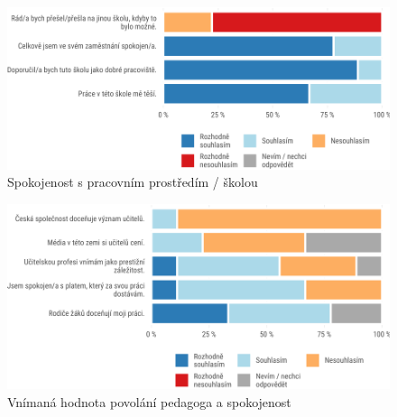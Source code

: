 \documentclass[12pt,a4paper,]{report}
\begin{document}
\begin{figure}

{\centering \includegraphics[width=\textwidth]{figs/tots6q4T3JSENVappdx-1}

}

\caption{Spokojenost s pracovním prostředím / školou}\label{fig:tots6q4T3JSENVappdx}
\end{figure}

\begin{figure}

{\centering \includegraphics[width=\textwidth]{figs/tots7q1teachperceptappdx-1}

}

\caption{Vnímaná hodnota povolání pedagoga a spokojenost}\label{fig:tots7q1teachperceptappdx}
\end{figure}
\end{document}
